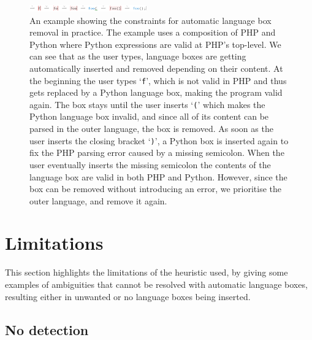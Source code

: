 \documentclass[sigplan,screen]{acmart}\settopmatter{printfolios=true,printccs=false,printacmref=false}
\newcommand{\qtt}[1]{`\texttt{#1}'\xspace}
\begin{document}
\begin{figure}
\begin{center}
\vspace{0.8em}
\includegraphics[width=0.45\textwidth]{images/autoremove_foo.png}
\vspace{-0.8em}
\end{center}
\caption{An example showing the constraints for automatic language box removal in practice.
The example uses a composition of PHP and Python where Python expressions are valid at
PHP's top-level.
We can see that as the user types, language boxes are getting automatically
inserted and removed depending on their content. At the beginning the user types
\qtt{f}, which is not valid in PHP and thus gets replaced by a Python
language box, making the program valid again. The box stays until the user
inserts \qtt{(} which makes the Python language box invalid, and since all of
its content can be parsed in the outer language, the box is removed.
As soon as the user inserts the closing bracket \qtt{)}, a Python box is
inserted again to fix the PHP parsing error caused by a missing semicolon. When the
user eventually inserts the missing semicolon the contents of the language box
are valid in both PHP and Python. However, since the box can be removed
without introducing an error, we prioritise the outer
language, and remove it again.}
\label{fig_autoremoval}
\end{figure}



\section{Limitations}
\label{sec_lbox_limitations}

This section highlights the limitations of the heuristic used, by giving some
examples of ambiguities that cannot be resolved with automatic language boxes,
resulting either in unwanted or no language boxes being inserted.

\subsection{No detection}
\end{document}
